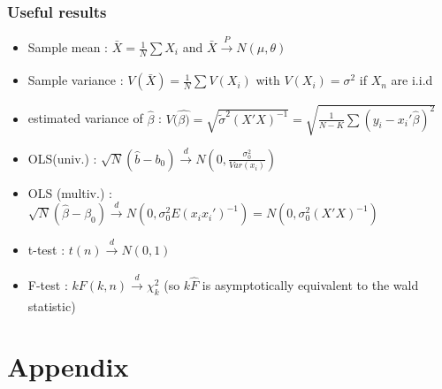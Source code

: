 \documentclass{article}
\begin{document}
\subsubsection{Useful results}
\begin{itemize}
    \item Sample mean : $\bar{X} = \frac{1}{N}\sum X_i$ and $\bar{X}\xrightarrow[]{P}N(\mu,\theta)$
    \item Sample variance : $V(\bar{X})=\frac{1}{N}\sum V(X_i)$ with $V(X_i)=\sigma^2$ if $X_n$ are i.i.d  
    \item estimated variance of $\hat{\beta}$ : $V(\hat{\beta)}=\sqrt{\tilde{\sigma}^2(X'X)^{-1}}= \sqrt{\frac{1}{N-K}\sum(y_i-x_i'\hat{\beta})^2}$
\end{itemize}
\begin{asymbox}
    \begin{itemize}
        \item OLS(univ.) : $\sqrt{N}(\hat{b}-b_0)\xrightarrow[]{d}N(0,\frac{\sigma_0^2}{Var(x_i)})$
        \item OLS (multiv.) : $\sqrt{N}(\hat{\beta}-\beta_0)\xrightarrow[]{d}N(0,\sigma_0^2E(x_ix_i')^{-1}) = N(0,\sigma_0^2(X'X)^{-1})$
        \item t-test : $t(n)\xrightarrow[]{d}N(0,1)$
        \item F-test : $kF(k,n)\xrightarrow[]{d} \chi^2_k$ (so $k\hat{F}$ is asymptotically equivalent to the wald statistic)
    \end{itemize}
\end{asymbox}

\section{Appendix}
\end{document}
